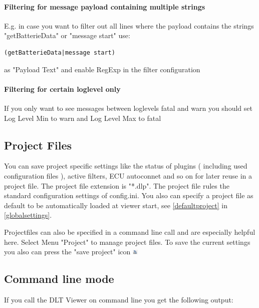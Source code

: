 \documentclass[a4paper,11pt]{article}
\begin{document}
\paragraph{Filtering for message payload containing multiple strings}

E.g. in case you want to filter out all lines where the payload contains the strings "getBatterieData" or "message start" use:

\begin{verbatim}
(getBatterieData|message start)
\end{verbatim}

as "Payload Text" and enable RegExp in the filter configuration

\paragraph{Filtering for certain loglevel only}
If you only want to see messages between loglevels fatal and warn you should set Log Level Min to warn and Log Level Max to fatal


\pagebreak
\subsection{Project Files}
\label{projectfiles}
You can save project specific settings like the status of plugins ( including used configuration files ), active filters, ECU autoconnet and so on for later reuse
in a project file. The project file extension is "*.dlp".
The project file rules the standard configuration settings of config.ini.
You also can specify a project file as default to be automatically loaded at viewer start, see \autoref{defaultproject} in \autoref{globalsettings}.

Projectfiles can also be specified in a command line call and are especially helpful here.
Select Menu "Project" to manage project files. To save the current settings you also can press the "save project" icon \includegraphics[width=0.02\textwidth]{images/saveprojecticon.png}

\pagebreak
\subsection{Command line mode}
\label{commandlinemode}
If you call the DLT Viewer on command line you get the following output:
\end{document}
